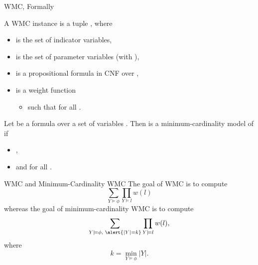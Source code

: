 \documentclass{beamer}
\begin{document}
\begin{frame}{WMC, Formally}
  \begin{definition}
    A \alert{WMC instance} is a tuple , where
    \begin{itemize}
    \item {} is the set of \alert{indicator variables},
    \item {} is the set of \alert{parameter variables} (with
      ),
    \item \structure{$\phi$} is a propositional formula in CNF over
      ,
    \item {} is a \alert{weight function}
      \begin{itemize}
      \item such that  for all .
      \end{itemize}
    \end{itemize}
  \end{definition}
  \begin{definition}
    Let \structure{$\phi$} be a formula over a set of variables .
    Then  is a \alert{minimum-cardinality model} of
    \structure{$\phi$} if
    \begin{itemize}
    \item {},
    \item and  for all .
    \end{itemize}
  \end{definition}
\end{frame}

\begin{frame}{WMC and Minimum-Cardinality WMC}
  The goal of \alert{WMC} is to compute
  \[
    \sum_{Y \models \phi} \prod_{Y \models l} w(l)
  \]
  whereas the goal of \alert{minimum-cardinality WMC} is to compute
  \[
    \sum_{Y \models \phi\text{, }\alert{|Y| = k}} \prod_{Y \models l} w(l),
  \]
  where
  \[
    k = \min_{Y \models \phi} |Y|.
  \]
\end{frame}
\end{document}
